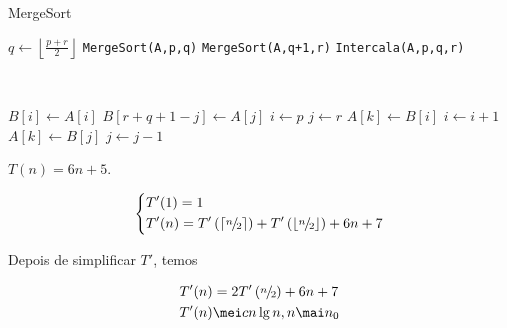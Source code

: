 \documentclass[a4paper]{memoir}
\begin{document}
\begin{sol}

\begin{algorithm}
\caption*{MergeSort}
\begin{algorithmic}[1]
		
  				
    \State $q \gets \left\lfloor {\frac{{p + r}}{2}} \right\rfloor$
    \State \texttt{MergeSort(A,p,q)}	
    \State \texttt{MergeSort(A,q+1,r)}
    \State \texttt{Intercala(A,p,q,r)}	
  \EndIf
\EndFunction
\end{algorithmic}
\end{algorithm}

\

\begin{algorithmic}[1]
		
  				
    \State $B[i] \gets A[i]$		
  \EndFor
    \State $B[r + q + 1 - j] \gets A[j]$
  \EndFor
  \State $i \gets p$			
  \State $j \gets r$			
  				
    		
      \State $A[k] \gets B[i]$		
      \State $i \gets i + 1$
    \Else
      \State $A[k] \gets B[j]$
      \State $j \gets j - 1$
    \EndIf
  \EndFor
\EndFunction
\end{algorithmic}

$T(n) = 6n + 5$.

\[
\left\{ \begin{gathered}
  T'(1) = 1 \hfill \\
  T'(n) = T'\left( {\left\lceil {{\raise0.5ex\hbox{$\scriptstyle n$}
\kern-0.1em/\kern-0.15em
\lower0.25ex\hbox{$\scriptstyle 2$}}} \right\rceil } \right) + T'\left( {\left\lfloor {{\raise0.5ex\hbox{$\scriptstyle n$}
\kern-0.1em/\kern-0.15em
\lower0.25ex\hbox{$\scriptstyle 2$}}} \right\rfloor } \right) + 6n + 7 \hfill \\ 
\end{gathered}  \right.
\]

Depois de simplificar $T'$, temos

\[
\begin{gathered}
  T'(n) = 2T'\left( {{\raise0.5ex\hbox{$\scriptstyle n$}
\kern-0.1em/\kern-0.15em
\lower0.25ex\hbox{$\scriptstyle 2$}}} \right) + 6n + 7 \hfill \\
  T'(n) \mei cn\lg n,n \mai n_0  \hfill \\ 
\end{gathered} 
\]


\end{sol}
\end{document}
